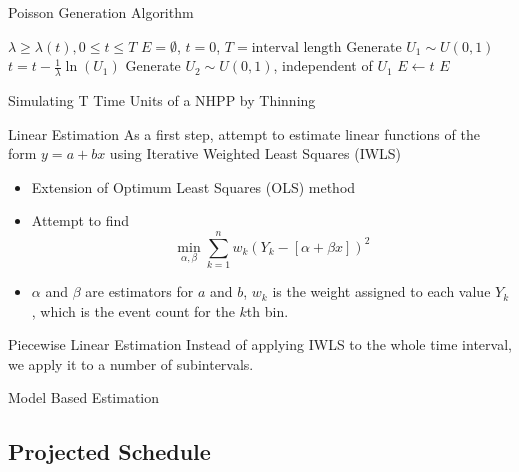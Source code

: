 \documentclass{beamer}
\begin{document}
\begin{frame}{Poisson Generation Algorithm}
  \begin{algorithm}[H]
    \begin{algorithmic}[1]
      \REQUIRE $\lambda\geq \lambda(t), 0 \leq t \leq T$
      \STATE $E=\emptyset$, $t=0$, $T=\text{interval length}$
      \STATE Generate $U_1\sim U(0,1)$
      \STATE $t=t-\frac{1}{\lambda}\ln(U_1)$
      \STATE Generate $U_2\sim U(0,1)$, independent of $U_1$
      \STATE $E \leftarrow t$
      \ENDIF
      \ENDWHILE
      \RETURN $E$
    \end{algorithmic}
    \caption{Simulating T Time Units of a NHPP by Thinning}
    \label{alg:seq}
  \end{algorithm}
\end{frame}

\begin{frame}{Linear Estimation}
  As a first step, attempt to estimate linear functions of the form $y=a+bx$ using Iterative Weighted Least Squares (IWLS)
  \begin{itemize}
  \item Extension of Optimum Least Squares (OLS) method
  \item Attempt to find \[\min_{\alpha,\beta}\sum_{k=1}^{n}w_k(Y_k-[\alpha+\beta x])^2\]
  \item $\alpha$ and $\beta$ are estimators for $a$ and $b$, $w_k$ is the weight assigned to each value $Y_k$, which is the event count for the $k$th bin.
  \end{itemize}
\end{frame}

\begin{frame}{Piecewise Linear Estimation}
  Instead of applying IWLS to the whole time interval, we apply it to a number of subintervals.
\end{frame}

\begin{frame}{Model Based Estimation}
\end{frame}


\subsection{Projected Schedule}
\end{document}
